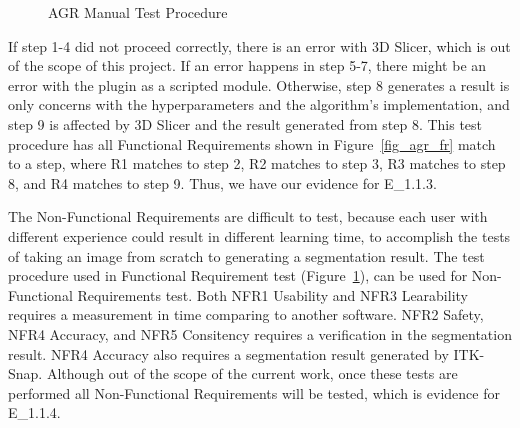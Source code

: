 \begin{figure}[H]
\caption[AGR Manual Test Procedure]{AGR Manual Test Procedure}
\label{test_procedure}
\end{figure}

If step 1-4 did not proceed correctly, there is an error with 3D Slicer, which is out of the scope of this project. If an error happens in step 5-7, there might be an error with the plugin as a scripted module. Otherwise, step 8 generates a result is only concerns with the hyperparameters and the algorithm's implementation, and step 9 is affected by 3D Slicer and the result generated from step 8. This test procedure has all Functional Requirements shown in Figure~\ref{fig_agr_fr} match to a step, where R1 matches to step 2, R2 matches to step 3, R3 matches to step 8, and R4 matches to step 9. Thus, we have our evidence for E\_1.1.3.

The Non-Functional Requirements are difficult to test, because each user with different experience could result in different learning time, to accomplish the tests of taking an image from scratch to generating a segmentation result. The test procedure used in Functional Requirement test (Figure~\ref{test_procedure}), can be used for Non-Functional Requirements test. Both NFR1 Usability and NFR3 Learability requires a measurement in time comparing to another software. NFR2 Safety, NFR4 Accuracy, and NFR5 Consitency requires a verification in the segmentation result. NFR4 Accuracy also requires a segmentation result generated by ITK-Snap. Although out of the scope of the current work, once these tests are performed all Non-Functional Requirements will be tested, which is evidence for E\_1.1.4.

